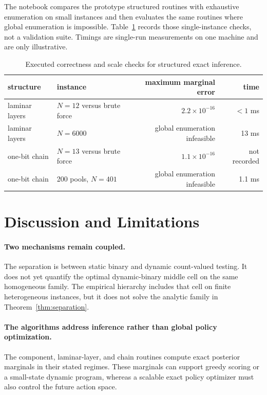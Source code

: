 \documentclass[11pt]{article}
\begin{document}
The notebook compares the prototype structured routines with exhaustive
enumeration on small instances and then evaluates the same routines where
global enumeration is impossible. Table~\ref{tab:structured} records those
single-instance checks, not a validation suite. Timings are single-run
measurements on one machine and are only illustrative.

\begin{table}[t]
\centering
\caption{Executed correctness and scale checks for structured exact inference.}
\label{tab:structured}
\small
\begin{tabular}{llrr}
\toprule
structure & instance & maximum marginal error & time \\
\midrule
laminar layers & $N=12$ versus brute force & $2.2\times10^{-16}$ & $<1$ ms \\
laminar layers & $N=6000$ & global enumeration infeasible & 13 ms \\
one-bit chain & $N=13$ versus brute force & $1.1\times10^{-16}$ & not recorded \\
one-bit chain & 200 pools, $N=401$ & global enumeration infeasible & 1.1 ms \\
\bottomrule
\end{tabular}
\end{table}

\section{Discussion and Limitations}

\paragraph{Two mechanisms remain coupled.}
The separation is between static binary and dynamic count-valued testing. It
does not yet quantify the optimal dynamic-binary middle cell on the same
homogeneous family. The empirical hierarchy includes that cell on finite
heterogeneous instances, but it does not solve the analytic family in
Theorem~\ref{thm:separation}.

\paragraph{The algorithms address inference rather than global policy optimization.}
The component, laminar-layer, and chain routines compute exact posterior
marginals in their stated regimes. These marginals can support greedy scoring
or a small-state dynamic program, whereas a scalable exact policy optimizer
must also control the future action space.
\end{document}
